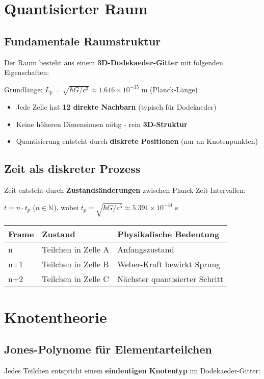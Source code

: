 \documentclass{article}
\begin{document}
\section{Quantisierter Raum}
\subsection*{Fundamentale Raumstruktur}
Der Raum besteht aus einem \textbf{3D-Dodekaeder-Gitter} mit folgenden Eigenschaften:

Grundlänge: $L_p = \sqrt{\hbar G/c^3} \approx 1.616 \times 10^{-35}$ m (Planck-Länge)

\begin{itemize}
    \item Jede Zelle hat \textbf{12 direkte Nachbarn} (typisch für Dodekaeder)
    \item Keine höheren Dimensionen nötig - rein \textbf{3D-Struktur}
    \item Quantisierung entsteht durch \textbf{diskrete Positionen} (nur an Knotenpunkten)
\end{itemize}

\subsection*{Zeit als diskreter Prozess}
Zeit entsteht durch \textbf{Zustandsänderungen} zwischen Planck-Zeit-Intervallen:

$ t = n \cdot t_p $ ($n \in \mathbb{N}$), wobei $t_p = \sqrt{\hbar G/c^5} \approx 5.391 \times 10^{-44}$ s

\begin{table}[H]
    \centering
    \begin{tabular}{lp{3cm}p{4cm}}
        \toprule
        Frame & Zustand & Physikalische Bedeutung \\
        \midrule
        n & Teilchen in Zelle A & Anfangszustand \\
        n+1 & Teilchen in Zelle B & Weber-Kraft bewirkt Sprung \\
        n+2 & Teilchen in Zelle C & Nächster quantisierter Schritt \\
        \bottomrule
    \end{tabular}
\end{table}

\section{Knotentheorie}
\subsection*{Jones-Polynome für Elementarteilchen}
Jedes Teilchen entspricht einem \textbf{eindeutigen Knotentyp} im Dodekaeder-Gitter:
\end{document}
